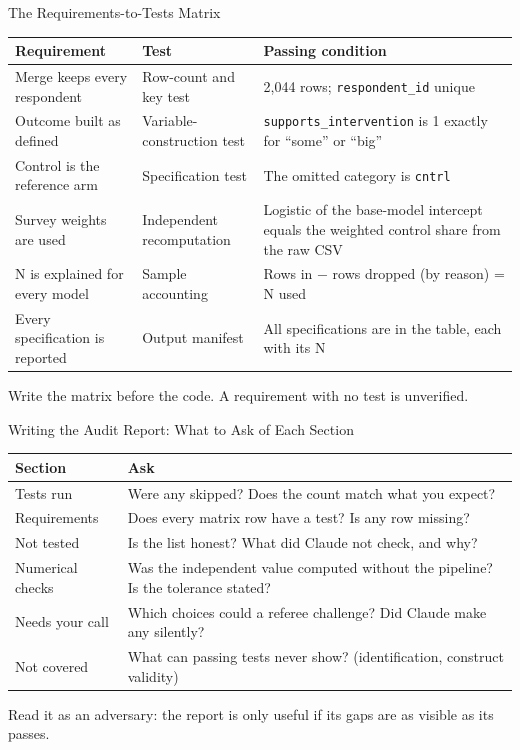 \documentclass[aspectratio=169, 11pt]{beamer}
\begin{document}
\begin{frame}{The Requirements-to-Tests Matrix}
  \footnotesize
  \renewcommand{\arraystretch}{1.2}
  \begin{tabular}{@{}L{0.27\textwidth}L{0.21\textwidth}L{0.42\textwidth}@{}}
    \toprule
    \textbf{Requirement} & \textbf{Test} & \textbf{Passing condition} \\
    \midrule
    Merge keeps every respondent & Row-count and key test & 2,044 rows; \texttt{respondent\_id} unique \\
    Outcome built as defined & Variable-construction test & \texttt{supports\_intervention} is 1 exactly for ``some'' or ``big'' \\
    Control is the reference arm & Specification test & The omitted category is \texttt{cntrl} \\
    Survey weights are used & Independent recomputation & Logistic of the base-model intercept equals the weighted control share from the raw CSV \\
    N is explained for every model & Sample accounting & Rows in $-$ rows dropped (by reason) = N used \\
    Every specification is reported & Output manifest & All specifications are in the table, each with its N \\
    \bottomrule
  \end{tabular}

  \vspace{0.5em}
  \small
  \alert{Write the matrix before the code.} A requirement with no test is unverified.
\end{frame}

\begin{frame}{Writing the Audit Report: What to Ask of Each Section}
  \small
  \renewcommand{\arraystretch}{1.25}
  \begin{tabular}{@{}L{0.22\textwidth}L{0.68\textwidth}@{}}
    \toprule
    \textbf{Section} & \textbf{Ask} \\
    \midrule
    Tests run & Were any skipped? Does the count match what you expect? \\
    Requirements & Does every matrix row have a test? Is any row missing? \\
    Not tested & Is the list honest? What did Claude not check, and why? \\
    Numerical checks & Was the independent value computed without the pipeline? Is the tolerance stated? \\
    Needs your call & Which choices could a referee challenge? Did Claude make any silently? \\
    Not covered & What can passing tests never show? (identification, construct validity) \\
    \bottomrule
  \end{tabular}

  \vspace{0.6em}
  \alert{Read it as an adversary: the report is only useful if its gaps are as visible as its passes.}
\end{frame}
\end{document}
